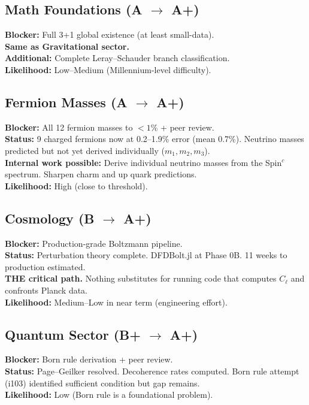 \documentclass[11pt,a4paper]{article}
\begin{document}
\subsection{Math Foundations (A $\to$ A+)}
\textbf{Blocker:} Full 3+1 global existence (at least small-data).\\
\textbf{Same as Gravitational sector.}\\
\textbf{Additional:} Complete Leray--Schauder branch classification.\\
\textbf{Likelihood:} \textcolor{hardproblem}{Low--Medium} (Millennium-level difficulty).

\subsection{Fermion Masses (A $\to$ A+)}
\textbf{Blocker:} All 12 fermion masses to $< 1\%$ + peer review.\\
\textbf{Status:} 9 charged fermions now at 0.2--1.9\% error (mean 0.7\%).
Neutrino masses predicted but not yet derived individually ($m_1, m_2, m_3$).\\
\textbf{Internal work possible:} Derive individual neutrino masses from the
Spin$^c$ spectrum. Sharpen charm and up quark predictions.\\
\textbf{Likelihood:} \textcolor{gradeA}{High} (close to threshold).

\subsection{Cosmology (B $\to$ A+)}
\textbf{Blocker:} Production-grade Boltzmann pipeline.\\
\textbf{Status:} Perturbation theory complete. DFDBolt.jl at Phase 0B.
11 weeks to production estimated.\\
\textbf{THE critical path.} Nothing substitutes for running code that
computes $C_\ell$ and confronts Planck data.\\
\textbf{Likelihood:} \textcolor{hardproblem}{Medium--Low in near term} (engineering effort).

\subsection{Quantum Sector (B+ $\to$ A+)}
\textbf{Blocker:} Born rule derivation + peer review.\\
\textbf{Status:} Page--Geilker resolved. Decoherence rates computed.
Born rule attempt (i103) identified sufficient condition but gap remains.\\
\textbf{Likelihood:} \textcolor{hardproblem}{Low} (Born rule is a foundational problem).
\end{document}
